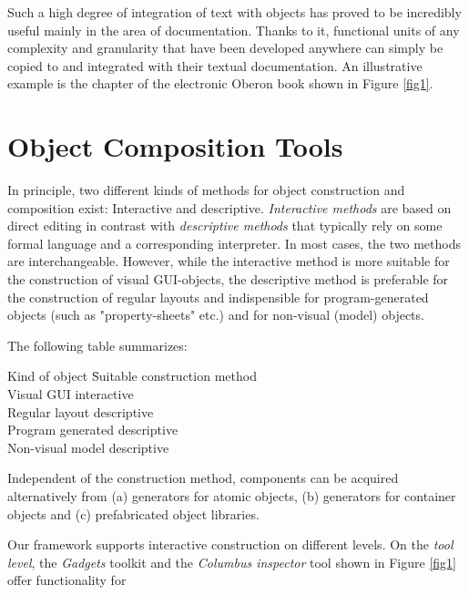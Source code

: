 Such a high degree of integration of text with objects has proved to be
incredibly useful mainly in the area of documentation. Thanks to it,
functional
units of any complexity and granularity that have been developed anywhere
can simply be copied to and integrated with their textual documentation.
An illustrative example is the chapter of the electronic Oberon book
shown in Figure \ref{fig1}.

\section{Object Composition Tools}

In principle, two different kinds of methods for object construction and
composition exist: Interactive and descriptive. {\em Interactive methods\/}
are based on direct editing in contrast with {\em descriptive methods\/}
that typically rely on some formal language and a corresponding interpreter.
In most cases, the two methods are interchangeable. However, while the
interactive method is more suitable for the construction of visual
GUI-objects,
the descriptive method is preferable for the construction of regular layouts
and indispensible for program-generated objects (such as "property-sheets"
etc.) and for non-visual (model) objects.

The following table summarizes:

\begin{tabbing}
Kind of object \hspace{3em} \=  Suitable construction method  \\[6pt]
Visual GUI  \>   interactive \\
Regular layout    \>   descriptive \\
Program generated     \>   descriptive \\
Non-visual model  \>   descriptive \\
\end{tabbing}

Independent of the construction method, components can be acquired
alternatively from (a) generators for atomic objects, (b) generators for
container objects and (c) prefabricated object libraries.


Our framework supports interactive construction on different levels.
On the {\em tool level\/}, the {\em Gadgets\/} toolkit \cite{5, 6, 7} and
the {\em Columbus inspector\/} tool shown in Figure \ref{fig1} offer
functionality for

